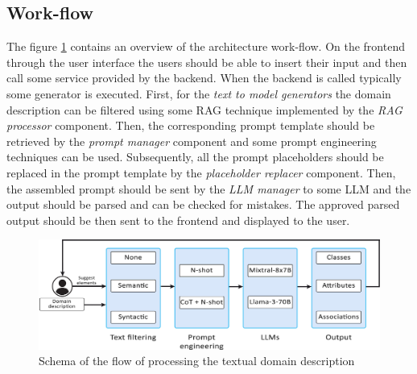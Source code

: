 \subsection{Work-flow}

The figure \ref{fig:work-flow} contains an overview of the architecture work-flow. On the frontend through the user interface the users should be able to insert their input and then call some service provided by the backend. When the backend is called typically some generator is executed. First, for the \emph{text to model generators} the domain description can be filtered using some RAG technique implemented by the \emph{RAG processor} component. Then, the corresponding prompt template should be retrieved by the \emph{prompt manager} component and some prompt engineering techniques can be used. Subsequently, all the prompt placeholders should be replaced in the prompt template by the \emph{placeholder replacer} component. Then, the assembled prompt should be sent by the \emph{LLM manager} to some LLM and the output should be parsed and can be checked for mistakes. The approved parsed output should be then sent to the frontend and displayed to the user.

\begin{figure}[!h]
    \centering
    \includegraphics[scale=0.23]{img/work-flow.jpg}
    \caption{\centering Schema of the flow of processing the textual domain description}
    \label{fig:work-flow}
\end{figure}
